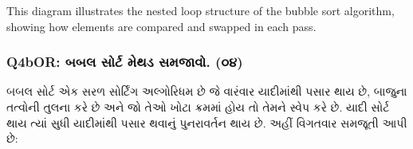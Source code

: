 \begin{Shaded}
\begin{Highlighting}[]
\end{Highlighting}
\end{Shaded}

This diagram illustrates the nested loop structure of the bubble sort
algorithm, showing how elements are compared and swapped in each pass.

\hypertarget{q4bor-uxaacuxaacuxab2-uxab8uxab0uxa9f-uxaaeuxaa5uxaa1-uxab8uxaaeuxa9cuxab5.-uxae6uxaea}{%
\subsubsection{Q4bOR: બબલ સોર્ટ મેથડ સમજાવો.
(૦૪)}\label{q4bor-uxaacuxaacuxab2-uxab8uxab0uxa9f-uxaaeuxaa5uxaa1-uxab8uxaaeuxa9cuxab5.-uxae6uxaea}}

બબલ સોર્ટ એક સરળ સોર્ટિંગ અલ્ગોરિધમ છે જે વારંવાર યાદીમાંથી પસાર થાય છે, બાજુના
તત્વોની તુલના કરે છે અને જો તેઓ ખોટા ક્રમમાં હોય તો તેમને સ્વેપ કરે છે. યાદી સોર્ટ થાય
ત્યાં સુધી યાદીમાંથી પસાર થવાનું પુનરાવર્તન થાય છે. અહીં વિગતવાર સમજૂતી આપી છે:

